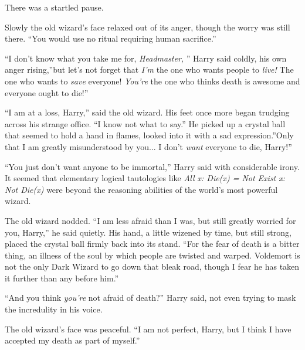 There was a startled pause.

Slowly the old wizard's face relaxed out of its anger, though the worry
was still there. ``You would use no ritual requiring human sacrifice.''

``I don't know what you take me for, \emph{Headmaster,} '' Harry said
coldly, his own anger rising,''but let's not forget that \emph{I'm} the
one who wants people to \emph{live!} The one who wants to \emph{save}
everyone! \emph{You're} the one who thinks death is awesome and everyone
ought to die!''

``I am at a loss, Harry,'' said the old wizard. His feet once more began
trudging across his strange office. ``I know not what to say.'' He
picked up a crystal ball that seemed to hold a hand in flames, looked
into it with a sad expression.''Only that I am greatly misunderstood by
you... I don't \emph{want} everyone to die, Harry!''

``You just don't want anyone to be immortal,'' Harry said with
considerable irony. It seemed that elementary logical tautologies like
\emph{All x: Die(x) = Not Exist x: Not Die(x)} were beyond the reasoning
abilities of the world's most powerful wizard.

The old wizard nodded. ``I am less afraid than I was, but still greatly
worried for you, Harry,'' he said quietly. His hand, a little wizened by
time, but still strong, placed the crystal ball firmly back into its
stand. ``For the fear of death is a bitter thing, an illness of the soul
by which people are twisted and warped. Voldemort is not the only Dark
Wizard to go down that bleak road, though I fear he has taken it further
than any before him.''

``And you think \emph{you're} not afraid of death?'' Harry said, not even
trying to mask the incredulity in his voice.

The old wizard's face was peaceful. ``I am not perfect, Harry, but I
think I have accepted my death as part of myself.''

